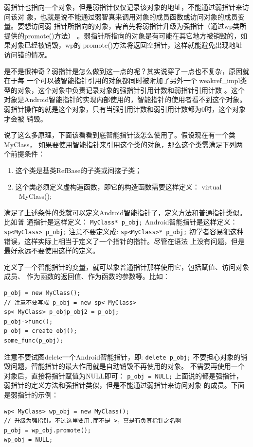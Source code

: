 \documentclass[a4paper,11pt]{article}
\begin{document}
弱指针也指向一个对象，但是弱指针仅仅记录该对象的地址，不能通过弱指针来访问该对
象，也就是说不能通过弱智真来调用对象的成员函数或访问对象的成员变量。要想访问弱
指针所指向的对象，需首先将弱指针升级为强指针（通过wp类所提供的promote()方法）
。弱指针所指向的对象是有可能在其它地方被销毁的，如果对象已经被销毁，wp的
promote()方法将返回空指针，这样就能避免出现地址访问错的情况。

是不是很神奇？弱指针是怎么做到这一点的呢？其实说穿了一点也不复杂，原因就在于每
一个可以被智能指针引用的对象都同时被附加了另外一个
weakref_impl类型的对象，这个对象中负责记录对象的强指针引用计数和弱指针引用计数
。这个对象是Android智能指针的实现内部使用的，智能指针的使用者看不到这个对象。
弱指针操作的就是这个对象，只有当强引用计数和弱引用计数都为0时，这个对象才会被
销毁。

说了这么多原理，下面该看看到底智能指针该怎么使用了。假设现在有一个类MyClass，
如果要使用智能指针来引用这个类的对象，那么这个类需满足下列两个前提条件：
\begin{enumerate}
    \item 这个类是基类RefBase的子类或间接子类；
    \item 这个类必须定义虚构造函数，即它的构造函数需要这样定义：
virtual ~MyClass(); 
\end{enumerate} 
满足了上述条件的类就可以定义Android智能指针了，定义方法和普通指针类似。比如普
通指针是这样定义：
\lstinline{MyClass* p_obj;}
Android智能指针是这样定义：
\lstinline{sp<MyClass> p_obj;}
注意不要定义成:
\lstinline{sp<MyClass>* p_obj;}
初学者容易犯这种错误，这样实际上相当于定义了一个指针的指针。尽管在语法
上没有问题，但是最好永远不要使用这样的定义。

定义了一个智能指针的变量，就可以象普通指针那样使用它，包括赋值、访问对象成员、
作为函数的返回值、作为函数的参数等。比如：
\begin{lstlisting}
p_obj = new MyClass();   
// 注意不要写成 p_obj = new sp< MyClass> 
sp< MyClass> p_objp_obj2 = p_obj;  
p_obj->func();  
p_obj = create_obj();  
some_func(p_obj); 
\end{lstlisting}
注意不要试图delete一个Android智能指针，即:
\lstinline|delete p_obj;|
不要担心对象的销毁问题，智能指针的最大作用就是自动销毁不再使用的对象。
不需要再使用一个对象后，直接将指针赋值为NULL即可：
\lstinline|p_obj = NULL;|
上面说的都是强指针，弱指针的定义方法和强指针类似，但是不能通过弱指针来访问对象
的成员。下面是弱指针的示例：
\begin{lstlisting}
wp< MyClass> wp_obj = new MyClass();  
// 升级为强指针。不过这里要用.而不是->，真是有负其指针之名啊  
p_obj = wp_obj.promote();   
wp_obj = NULL; 
\end{lstlisting}
\end{document}
